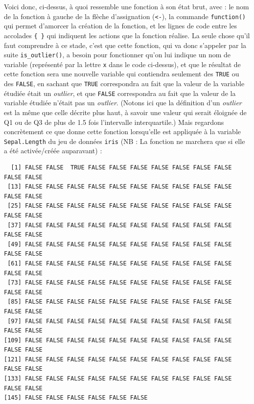 \documentclass[
  letterpaper,
]{book}
\newenvironment{Shaded}{\begin{snugshade}}{\end{snugshade}}
\newcommand{\AttributeTok}[1]{\textcolor[rgb]{0.40,0.45,0.13}{#1}}
\newcommand{\FunctionTok}[1]{\textcolor[rgb]{0.28,0.35,0.67}{#1}}
\newcommand{\NormalTok}[1]{\textcolor[rgb]{0.00,0.23,0.31}{#1}}
\newcommand{\SpecialCharTok}[1]{\textcolor[rgb]{0.37,0.37,0.37}{#1}}
\begin{document}
Voici donc, ci-dessus, à quoi ressemble une fonction à son état brut,
avec : le nom de la fonction à gauche de la flèche d'assignation
(\texttt{\textless{}-}), la commande \texttt{function()} qui permet
d'amorcer la création de la fonction, et les lignes de code entre les
accolades \texttt{\{\ \}} qui indiquent les actions que la fonction
réalise. La seule chose qu'il faut comprendre à ce stade, c'est que
cette fonction, qui va donc s'appeler par la suite
\texttt{is\_outlier()}, a besoin pour fonctionner qu'on lui indique un
nom de variable (représenté par la lettre \texttt{x} dans le code
ci-dessus), et que le résultat de cette fonction sera une nouvelle
variable qui contiendra seulement des \texttt{TRUE} ou des
\texttt{FALSE}, en sachant que \texttt{TRUE} correspondra au fait que la
valeur de la variable étudiée était un \emph{outlier}, et que
\texttt{FALSE} correspondra au fait que la valeur de la variable étudiée
n'était pas un \emph{outlier}. (Notons ici que la définition d'un
\emph{outlier} est la même que celle décrite plus haut, à savoir une
valeur qui serait éloignée de Q1 ou de Q3 de plus de 1.5 fois
l'intervalle interquartile.) Mais regardons concrètement ce que donne
cette fonction lorsqu'elle est appliquée à la variable
\texttt{Sepal.Length} du jeu de données \texttt{iris} (NB : La fonction
ne marchera que si elle a été activée/créée auparavant) :

\begin{Shaded}
\end{Shaded}

\begin{verbatim}
  [1] FALSE FALSE  TRUE FALSE FALSE FALSE FALSE FALSE FALSE FALSE FALSE FALSE
 [13] FALSE FALSE FALSE FALSE FALSE FALSE FALSE FALSE FALSE FALSE FALSE FALSE
 [25] FALSE FALSE FALSE FALSE FALSE FALSE FALSE FALSE FALSE FALSE FALSE FALSE
 [37] FALSE FALSE FALSE FALSE FALSE FALSE FALSE FALSE FALSE FALSE FALSE FALSE
 [49] FALSE FALSE FALSE FALSE FALSE FALSE FALSE FALSE FALSE FALSE FALSE FALSE
 [61] FALSE FALSE FALSE FALSE FALSE FALSE FALSE FALSE FALSE FALSE FALSE FALSE
 [73] FALSE FALSE FALSE FALSE FALSE FALSE FALSE FALSE FALSE FALSE FALSE FALSE
 [85] FALSE FALSE FALSE FALSE FALSE FALSE FALSE FALSE FALSE FALSE FALSE FALSE
 [97] FALSE FALSE FALSE FALSE FALSE FALSE FALSE FALSE FALSE FALSE FALSE FALSE
[109] FALSE FALSE FALSE FALSE FALSE FALSE FALSE FALSE FALSE FALSE FALSE FALSE
[121] FALSE FALSE FALSE FALSE FALSE FALSE FALSE FALSE FALSE FALSE FALSE FALSE
[133] FALSE FALSE FALSE FALSE FALSE FALSE FALSE FALSE FALSE FALSE FALSE FALSE
[145] FALSE FALSE FALSE FALSE FALSE FALSE
\end{verbatim}
\end{document}
